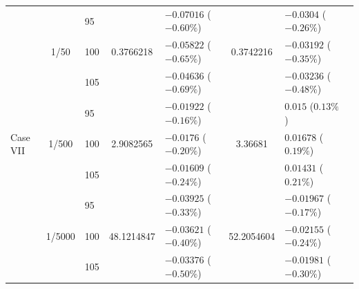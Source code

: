 \begin{table}[htbp]
{\begin{tabular}{lclclclc}
    \midrule
    \multirow{9}{*}{Case VII}
    & \multirow{3}{*}{1/50}  & 95  & \multirow{3}{*}{0.3766218}  & $-0.07016$ ($-0.60\%$)   & \multirow{3}{*}{0.3742216} & $-0.0304$ ($-0.26\%$)     \\
    &                         & 100 &                           & $-0.05822$ ($-0.65\%$)     &                           & $-0.03192$ ($-0.35\%$)   \\
    &                         & 105 &                           & $-0.04636$ ($-0.69\%$)    &                           & $-0.03236$ ($-0.48\%$)     \\
    \cmidrule(lr){2-7}
    & \multirow{3}{*}{1/500} & 95 & \multirow{3}{*}{2.9082565}  & $-0.01922$ ($-0.16\%$)  & \multirow{3}{*}{3.36681} & $0.015$ ($0.13\%$)   \\
    &                         & 100 &                           & $-0.0176$ ($-0.20\%$)   &                           & $0.01678$ ($0.19\%$)    \\
    &                         & 105  &                           & $-0.01609$ ($-0.24\%$)   &                           & $0.01431$ ($0.21\%$)   \\
    \cmidrule(lr){2-7}
    & \multirow{3}{*}{1/5000}& 95 & \multirow{3}{*}{48.1214847}& $-0.03925$ ($-0.33\%$)  & \multirow{3}{*}{52.2054604} & $-0.01967$ ($-0.17\%$)   \\
    &                         & 100 &                           & $-0.03621$ ($-0.40\%$)   &                           & $-0.02155$ ($-0.24\%$)    \\
    &                         & 105  &                           & $-0.03376$ ($-0.50\%$)    &                           & $-0.01981$ ($-0.30\%$)   \\
    \bottomrule
  \end{tabular}%
  }
\end{table}

